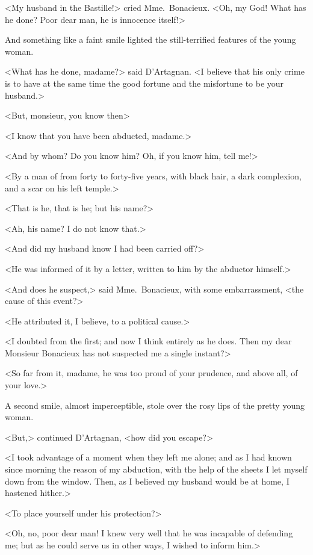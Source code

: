 <My husband in the Bastille!> cried Mme.~Bonacieux. <Oh, my God! What has he done? Poor dear man, he is innocence itself!> 

And something like a faint smile lighted the still-terrified features of the young woman. 

<What has he done, madame?> said D'Artagnan. <I believe that his only crime is to have at the same time the good fortune and the misfortune to be your husband.> 

<But, monsieur, you know then\longdash> 

<I know that you have been abducted, madame.> 

<And by whom? Do you know him? Oh, if you know him, tell me!> 

<By a man of from forty to forty-five years, with black hair, a dark complexion, and a scar on his left temple.> 

<That is he, that is he; but his name?> 

<Ah, his name? I do not know that.> 

<And did my husband know I had been carried off?> 

<He was informed of it by a letter, written to him by the abductor himself.> 

<And does he suspect,> said Mme.~Bonacieux, with some embarrassment, <the cause of this event?> 

<He attributed it, I believe, to a political cause.> 

<I doubted from the first; and now I think entirely as he does. Then my dear Monsieur Bonacieux has not suspected me a single instant?> 

<So far from it, madame, he was too proud of your prudence, and above all, of your love.> 

A second smile, almost imperceptible, stole over the rosy lips of the pretty young woman. 

<But,> continued D'Artagnan, <how did you escape?> 

<I took advantage of a moment when they left me alone; and as I had known since morning the reason of my abduction, with the help of the sheets I let myself down from the window. Then, as I believed my husband would be at home, I hastened hither.> 

<To place yourself under his protection?> 

<Oh, no, poor dear man! I knew very well that he was incapable of defending me; but as he could serve us in other ways, I wished to inform him.> 

